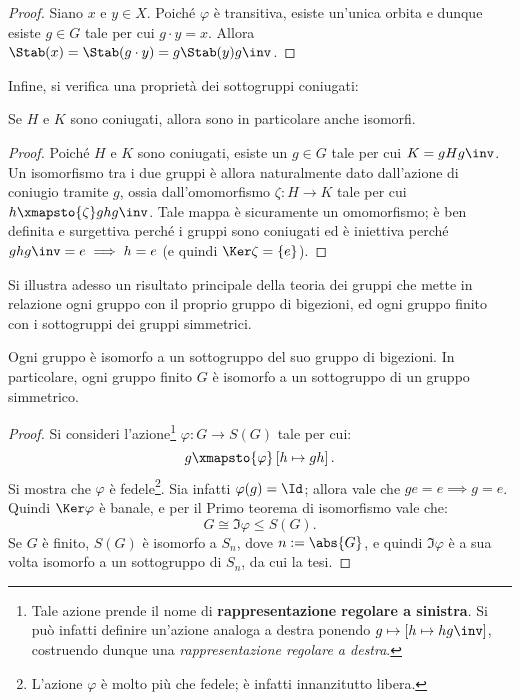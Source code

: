 \documentclass[12pt]{scrartcl}
\begin{document}
	\begin{proof}
		Siano $x$ e $y \in X$. Poiché $\varphi$ è transitiva, esiste un'unica orbita
		e dunque esiste $g \in G$ tale per cui $g \cdot y = x$. Allora
		$\Stab(x) = \Stab(g \cdot y) = g \Stab(y) g\inv$.
	\end{proof}
	
	Infine, si verifica una proprietà dei sottogruppi coniugati:
	
	\begin{proposition}
		Se $H$ e $K$ sono coniugati, allora sono in particolare anche isomorfi.
	\end{proposition}
	
	\begin{proof}
		Poiché $H$ e $K$ sono coniugati, esiste un $g \in G$ tale per cui
		$K = gHg\inv$.
		Un isomorfismo tra i due gruppi è allora naturalmente dato dall'azione di
		coniugio tramite $g$, ossia dall'omomorfismo $\zeta : H \to K$
		tale per cui $h \xmapsto{\zeta} ghg\inv$. Tale mappa è sicuramente un omomorfismo;
		è ben definita e surgettiva perché i gruppi sono coniugati ed è iniettiva
		perché $ghg\inv = e \implies h = e$ (e quindi $\Ker \zeta = \{e\}$).
	\end{proof}
	
	\bigskip
	
	Si illustra adesso un risultato principale della teoria dei gruppi che mette in
	relazione ogni gruppo con il proprio gruppo di bigezioni, ed ogni gruppo finito con i
	sottogruppi dei gruppi simmetrici.
	
	\begin{theorem}[di Cayley]
		Ogni gruppo è isomorfo a un sottogruppo del suo gruppo di bigezioni.
		In particolare, ogni gruppo finito $G$ è isomorfo a un sottogruppo di un gruppo
		simmetrico.
	\end{theorem}
	
	\begin{proof}
		Si consideri l'azione\footnote{Tale azione prende il nome di \textbf{rappresentazione regolare a sinistra}.
		Si può infatti definire un'azione analoga a destra ponendo $g \mapsto \left[ h \mapsto hg\inv \right]$,
		costruendo dunque una \textit{rappresentazione regolare a destra}.} $\varphi : G \to S(G)$ tale per cui:
		\[ g \xmapsto{\varphi} \left[ h \mapsto gh \right]. \]
		Si mostra che $\varphi$ è fedele\footnote{L'azione $\varphi$ è molto
		più che fedele; è infatti innanzitutto libera.}. Sia infatti $\varphi(g) = \Id$; allora
		vale che $ge = e \implies g = e$. Quindi $\Ker \varphi$ è banale, e per il
		Primo teorema di isomorfismo vale che:
		\[ G \cong \Im \varphi \leq S(G). \]
		Se $G$ è finito, $S(G)$ è isomorfo a $S_n$, dove $n := \abs{G}$, e quindi
		$\Im \varphi$ è a sua volta isomorfo a un sottogruppo di $S_n$, da cui
		la tesi.
	\end{proof}
	
\end{document}
